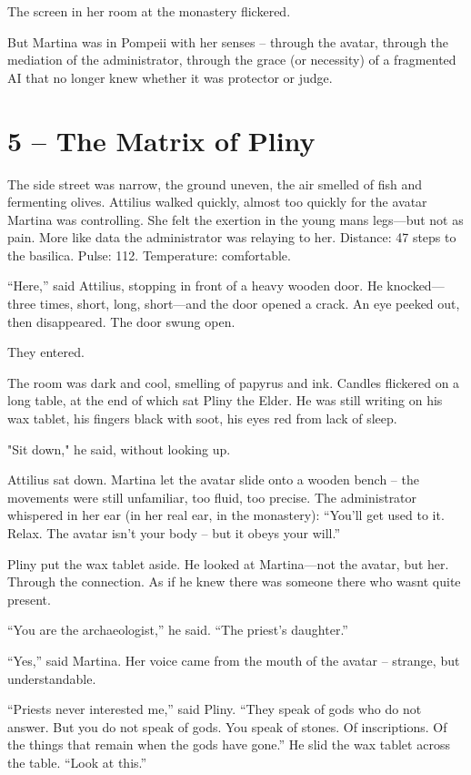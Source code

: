 \documentclass[
]{article}
\begin{document}
The screen in her room at the monastery flickered.

But Martina was in Pompeii with her senses -- through the avatar, through the mediation of the administrator, through the grace (or necessity) of a fragmented AI that no longer knew whether it was protector or judge.

\section{5 -- The Matrix of Pliny}\label{the-matrix-of-pliny}

The side street was narrow, the ground uneven, the air smelled of fish and fermenting olives. Attilius walked quickly, almost too quickly for the avatar Martina was controlling. She felt the exertion in the young man\textquotesingle s legs---but not as pain. More like data the administrator was relaying to her. Distance: 47 steps to the basilica. Pulse: 112. Temperature: comfortable.

``Here,'' said Attilius, stopping in front of a heavy wooden door. He knocked---three times, short, long, short---and the door opened a crack. An eye peeked out, then disappeared. The door swung open.

They entered.

The room was dark and cool, smelling of papyrus and ink. Candles flickered on a long table, at the end of which sat Pliny the Elder. He was still writing on his wax tablet, his fingers black with soot, his eyes red from lack of sleep.

"Sit down," he said, without looking up.

Attilius sat down. Martina let the avatar slide onto a wooden bench -- the movements were still unfamiliar, too fluid, too precise. The administrator whispered in her ear (in her real ear, in the monastery): ``You'll get used to it. Relax. The avatar isn't your body -- but it obeys your will.''

Pliny put the wax tablet aside. He looked at Martina---not the avatar, but her. Through the connection. As if he knew there was someone there who wasn\textquotesingle t quite present.

``You are the archaeologist,'' he said. ``The priest's daughter.''

``Yes,'' said Martina. Her voice came from the mouth of the avatar -- strange, but understandable.

``Priests never interested me,'' said Pliny. ``They speak of gods who do not answer. But you do not speak of gods. You speak of stones. Of inscriptions. Of the things that remain when the gods have gone.'' He slid the wax tablet across the table. ``Look at this.''
\end{document}
